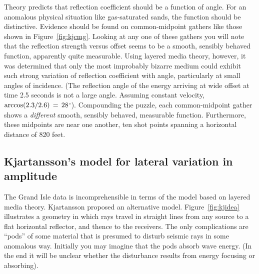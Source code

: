 \par
Theory predicts that reflection coefficient should
be a function of angle.
For an anomalous physical situation
like gas-saturated sands, the function should be distinctive.
Evidence should be found on common-midpoint gathers
like those shown in Figure~\ref{fig:kjcmg}.
Looking at any one of these gathers you will note that the reflection
strength versus offset seems to be a smooth,
sensibly behaved function, apparently quite measurable.
Using layered media theory, however, it was determined that only
the most improbably bizarre medium could exhibit such strong
variation of reflection coefficient with angle,
particularly at small angles of incidence.
(The reflection angle of the energy arriving at wide offset at time 2.5 seconds
is not a large angle.
Assuming constant velocity, ${\rm arccos} (2.3/2.6)\,=\,28$$^\circ$).
Compounding the puzzle, each common-midpoint gather shows a
{\em  different}
smooth, sensibly behaved, measurable function. 
Furthermore, these midpoints are near one another,
ten shot points 
spanning a horizontal distance of 820 feet.
\subsection{Kjartansson's model for lateral variation in amplitude}
\par
The Grand Isle data is incomprehensible in terms of the
model based on layered media theory.
Kjartansson proposed an alternative model.
Figure~\ref{fig:kjidea} illustrates a geometry in which rays travel
in straight lines from any source to a flat horizontal reflector,
and thence to the receivers.
The only complications are ``pods'' of some material
that is presumed to disturb seismic rays in some anomalous way.
Initially you may imagine that the pods absorb wave energy.
(In the end it will be unclear whether the disturbance results from
energy focusing or absorbing).

